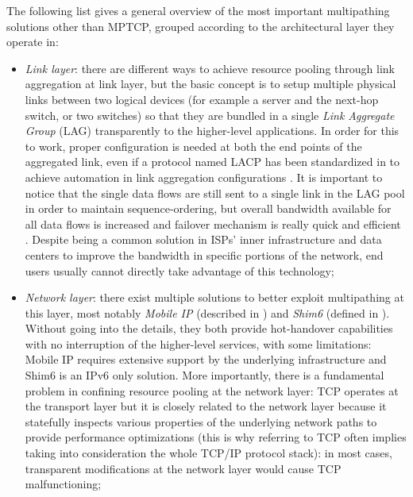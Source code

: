 The following list gives a general overview of the most important multipathing solutions other than MPTCP, grouped according to the architectural layer they operate in:
\begin{itemize}
  \item \textit{Link layer}: there are different ways to achieve resource pooling through link aggregation at link layer, but the basic concept is to setup multiple physical links between two logical devices (for example a server and the next-hop switch, or two switches) so that they are bundled in a single \textit{Link Aggregate Group} (LAG) transparently to the higher-level applications. In order for this to work, proper configuration is needed at both the end points of the aggregated link, even if a protocol named LACP has been standardized in to achieve automation in link aggregation configurations \cite{thenetworkway}. It is important to notice that the single data flows are still sent to a single link in the LAG pool in order to maintain sequence-ordering, but overall bandwidth available for all data flows is increased and failover mechanism is really quick and efficient \cite{thenetworkway}. Despite being a common solution in ISPs' inner infrastructure and data centers to improve the bandwidth in specific portions of the network, end users usually cannot directly take advantage of this technology;
  \item \textit{Network layer}: there exist multiple solutions to better exploit multipathing at this layer, most notably \textit{Mobile IP} (described in ) and \textit{Shim6} (defined in ). Without going into the details, they both provide hot-handover capabilities with no interruption of the higher-level services, with some limitations: Mobile IP requires extensive support by the underlying infrastructure and Shim6 is an IPv6 only solution. More importantly, there is a fundamental problem in confining resource pooling at the network layer: TCP operates at the transport layer but it is closely related to the network layer because it statefully inspects various properties of the underlying network paths to provide performance optimizations (this is why referring to TCP often implies taking into consideration the whole TCP/IP protocol stack): in most cases, transparent modifications at the network layer would cause TCP malfunctioning;

\end{itemize}
